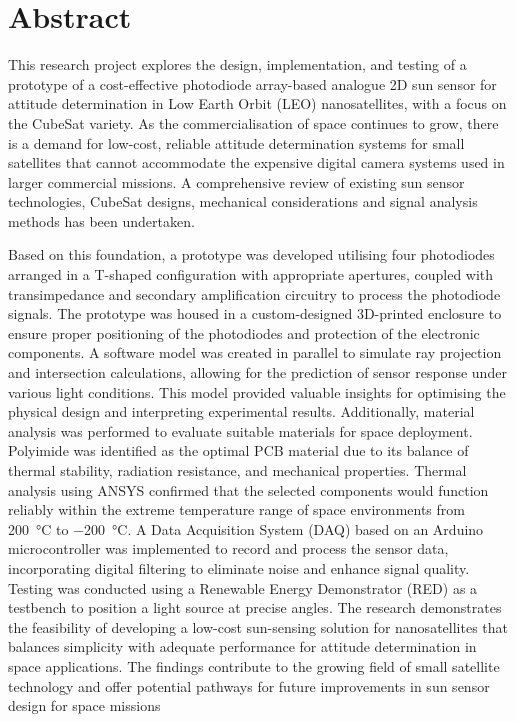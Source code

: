 \chapter*{Abstract}
This research project explores the design, implementation, and testing of a prototype of a cost-effective photodiode array-based analogue 2D sun sensor for attitude determination in Low Earth Orbit (LEO) nanosatellites, with a focus on the CubeSat variety. 
As the commercialisation of space continues to grow, there is a demand for low-cost, reliable attitude determination systems for small satellites that cannot accommodate the expensive digital camera systems used in larger commercial missions.
A comprehensive review of existing sun sensor technologies, CubeSat designs, mechanical considerations and signal analysis methods has been undertaken.

Based on this foundation, a prototype was developed utilising four photodiodes arranged in a T-shaped configuration with appropriate apertures, coupled with transimpedance and secondary amplification circuitry to process the photodiode signals. 
The prototype was housed in a custom-designed 3D-printed enclosure to ensure proper positioning of the photodiodes and protection of the electronic components.
A software model was created in parallel to simulate ray projection and intersection calculations, allowing for the prediction of sensor response under various light conditions. 
This model provided valuable insights for optimising the physical design and interpreting experimental results. 
Additionally, material analysis was performed to evaluate suitable materials for space deployment. Polyimide was identified as the optimal PCB material due to its balance of thermal stability, radiation resistance, and mechanical properties. 
Thermal analysis using ANSYS confirmed that the selected components would function reliably within the extreme temperature range of space environments from \SI{200}{\celsius} to \SI{-200}{\celsius}.
A Data Acquisition System (DAQ) based on an Arduino microcontroller was implemented to record and process the sensor data, incorporating digital filtering to eliminate noise and enhance signal quality. 
Testing was conducted using a Renewable Energy Demonstrator (RED) as a testbench to position a light source at precise angles.
The research demonstrates the feasibility of developing a low-cost sun-sensing solution for nanosatellites that balances simplicity with adequate performance for attitude determination in space applications. 
The findings contribute to the growing field of small satellite technology and offer potential pathways for future improvements in sun sensor design for space missions

